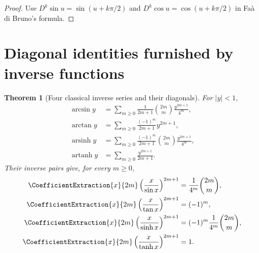 \documentclass[11pt,a4paper,oneside,openany]{book}
\newtheorem{theorem}{Theorem}[chapter]
\theoremstyle{definition}
\theoremstyle{remark}
\begin{document}
\begin{proof}
Use $D^k\sin u=\sin(u+k\pi/2)$ and
$D^k\cos u=\cos(u+k\pi/2)$ in Fa\`a di Bruno's formula.
\end{proof}

\section{Diagonal identities furnished by inverse functions}

\begin{theorem}[Four classical inverse series and their diagonals]
\label{thm:merged-four-inverse-series}
For $|y|<1$,
\begin{align}
 \arcsin y
 &=\sum_{m\geq0}\frac1{2m+1}\binom{2m}{m}
      \frac{y^{2m+1}}{4^m},                                       \label{eq:merged-arcsin-series}\\
 \arctan y
 &=\sum_{m\ge0}\frac{(-1)^m}{2m+1}y^{2m+1},                       \label{eq:merged-arctan-series}\\
 \operatorname{arsinh}y
 &=\sum_{m\ge0}\frac{(-1)^m}{2m+1}\binom{2m}{m}
      \frac{y^{2m+1}}{4^m},                                       \label{eq:merged-arsinh-series}\\
 \operatorname{artanh}y
 &=\sum_{m\ge0}\frac{y^{2m+1}}{2m+1}.                             \label{eq:merged-artanh-series}
\end{align}
Their inverse pairs give, for every $m\ge0$,
\begin{align}
 \CoefficientExtraction{x}{2m}\left(\frac{x}{\sin x}\right)^{2m+1}
 &=\frac1{4^m}\binom{2m}{m},                                      \label{eq:merged-sine-diagonal}\\
 \CoefficientExtraction{x}{2m}\left(\frac{x}{\tan x}\right)^{2m+1}
 &=(-1)^m,                                                         \label{eq:merged-tangent-diagonal}\\
 \CoefficientExtraction{x}{2m}\left(\frac{x}{\sinh x}\right)^{2m+1}
 &=(-1)^m\frac1{4^m}\binom{2m}{m},                                \label{eq:merged-sinh-diagonal}\\
 \CoefficientExtraction{x}{2m}\left(\frac{x}{\tanh x}\right)^{2m+1}
 &=1.                                                              \label{eq:merged-tanh-diagonal}
\end{align}
\end{theorem}
\end{document}
